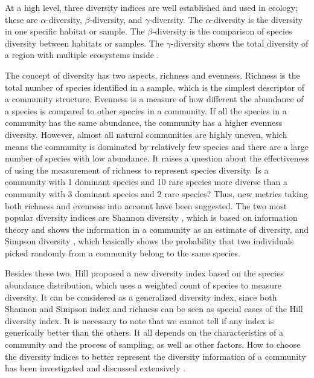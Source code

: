 At a high level, three diversity indices are well established and used in
ecology; these are $\alpha$-diversity, $\beta$-diversity, and
$\gamma$-diversity. The $\alpha$-diversity is the diversity in one specific habitat
or sample. The $\beta$-diversity is the comparison of species diversity between habitats or
samples. The $\gamma$-diversity shows the total diversity of a region
with multiple ecosystems inside \cite{magurran2011biological}.

The concept of diversity has two aspects, richness and evenness. Richness is
the total number of species identified in a sample, which is the simplest
descriptor of a community structure. Evenness is a measure of how different the
abundance of a species is compared to other species in a community. If all the
species in a community has the same abundance, the community has a higher
evenness diversity. However, almost all natural communities are highly uneven,
which means the community is dominated by relatively few species and there are
a large number of species with low abundance. It raises a question about the
effectiveness of using the measurement of richness to represent species
diversity. Is a community with 1 dominant species and 10 rare species more
diverse than a community with 3 dominant species and 2 rare species? Thus, new
metrics taking both richness and evenness into account have been suggested. The two
most popular diversity indices are Shannon diversity
\cite{shannon2001mathematical}, which is based on information theory and shows
the information in a community as an estimate of diversity, and Simpson
diversity \cite{simpson1949measurement}, which basically shows the probability
that two individuals picked randomly from a community belong to the same
species.

Besides these two, Hill \cite{hill1973diversity} proposed a new diversity index
based on the species abundance distribution, which uses a weighted count of
species to measure diversity. It can be considered as a generalized diversity
index, since both Shannon and Simpson index and richness can be seen as special
cases of the Hill diversity index. It is necessary to note that we cannot tell
if any index is generically better than the others. It all depends on the
characteristics of a community and the process of sampling, as well as other
factors. How to choose the diversity indices to better represent the 
diversity information of a community has been investigated and discussed extensively 
\cite{Bohannan2003,Haegeman:2013aa,Morris2014}.

